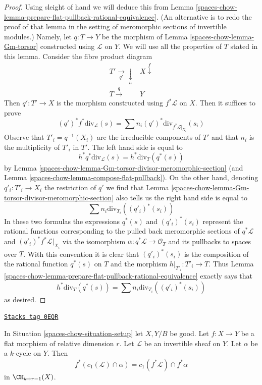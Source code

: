 \begin{proof}
Using sleight of hand we will deduce this from
Lemma \ref{spaces-chow-lemma-prepare-flat-pullback-rational-equivalence}.
(An alternative is to redo the proof of that lemma in the
setting of meromorphic sections of invertible modules.)
Namely, let $q : T \to Y$ be the morphism of
Lemma \ref{spaces-chow-lemma-Gm-torsor} constructed using $\mathcal{L}$ on $Y$.
We will use all the properties of $T$ stated in this lemma.
Consider the fibre product diagram
$$
\begin{array}{cc}T' \underset{q'}{\longrightarrow}\underset{h}{\downarrow} & X \overset{f}{\downarrow} \\ T \overset{q}{\longrightarrow} & Y\end{array}
$$
Then $q' : T' \to X$ is the morphism constructed using $f^*\mathcal{L}$
on $X$. Then it suffices to prove
$$
(q')^*f^*\text{div}_\mathcal{L}(s) =
\sum n_i (q')^*\text{div}_{f^*\mathcal{L}|_{X_i}}(s_i)
$$
Observe that $T'_i = q^{-1}(X_i)$ are the irreducible components of $T'$
and that $n_i$ is the multiplicity of $T'_i$ in $T'$.
The left hand side is equal to
$$
h^*q^*\text{div}_\mathcal{L}(s) = h^*\text{div}_T(q^*(s))
$$
by Lemma \ref{spaces-chow-lemma-Gm-torsor-divisor-meromorphic-section}
(and Lemma \ref{spaces-chow-lemma-compose-flat-pullback}).
On the other hand, denoting $q'_i : T'_i \to X_i$
the restriction of $q'$ we find that
Lemma \ref{spaces-chow-lemma-Gm-torsor-divisor-meromorphic-section}
also tells us the right hand side is equal to
$$
\sum n_i \text{div}_{T_i}((q'_i)^*(s_i))
$$
In these two formulas the expressions $q^*(s)$ and $(q'_i)^*(s_i)$
represent the rational functions corresponding to the pulled back
meromorphic sections of $q^*\mathcal{L}$ and $(q'_i)^*f^*\mathcal{L}|_{X_i}$
via the isomorphism $\alpha : q^*\mathcal{L} \to \mathcal{O}_T$
and its pullbacks to spaces over $T$. With this convention it is
clear that $(q'_i)^*(s_i)$ is the composition of the rational function
$q^*(s)$ on $T$ and the morphism $h|_{T'_i} : T'_i \to T$.
Thus Lemma \ref{spaces-chow-lemma-prepare-flat-pullback-rational-equivalence}
exactly says that
$$
h^*\text{div}_T(q^*(s)) = \sum n_i \text{div}_{T_i}((q'_i)^*(s_i))
$$
as desired.
\end{proof}

\begin{lemma}
\label{spaces-chow-lemma-flat-pullback-cap-c1}
\href{https://stacks.math.columbia.edu/tag/0EQR}{\texttt{Stacks tag 0EQR}}

In Situation \ref{spaces-chow-situation-setup} let $X, Y/B$ be good.
Let $f : X \to Y$ be a flat morphism of relative dimension $r$.
Let $\mathcal{L}$ be an invertible sheaf on $Y$.
Let $\alpha$ be a $k$-cycle on $Y$.
Then
$$
f^*(c_1(\mathcal{L}) \cap \alpha) = c_1(f^*\mathcal{L}) \cap f^*\alpha
$$
in $\CH_{k + r - 1}(X)$.
\end{lemma}


